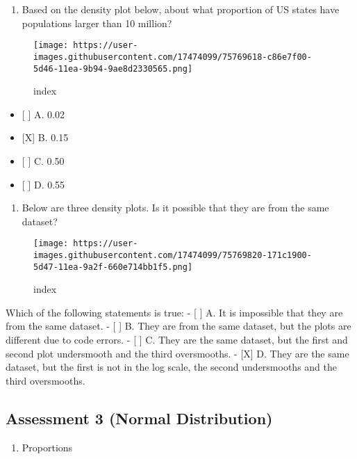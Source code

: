 \documentclass[]{article}
\providecommand{\tightlist}{%
  \setlength{\itemsep}{0pt}\setlength{\parskip}{0pt}}
\begin{document}
\begin{enumerate}
\def\labelenumi{\arabic{enumi}.}
\setcounter{enumi}{8}
\tightlist
\item
  Based on the density plot below, about what proportion of US states
  have populations larger than 10 million?
\end{enumerate}

\begin{figure}
\centering
\texttt{[image: https://user-images.githubusercontent.com/17474099/75769618-c86e7f00-5d46-11ea-9b94-9ae8d2330565.png]}
\caption{index}
\end{figure}

\begin{itemize}
\tightlist
\item
  {[} {]} A. 0.02
\item
  {[}X{]} B. 0.15
\item
  {[} {]} C. 0.50
\item
  {[} {]} D. 0.55
\end{itemize}

\begin{enumerate}
\def\labelenumi{\arabic{enumi}.}
\setcounter{enumi}{9}
\tightlist
\item
  Below are three density plots. Is it possible that they are from the
  same dataset?
\end{enumerate}

\begin{figure}
\centering
\texttt{[image: https://user-images.githubusercontent.com/17474099/75769820-171c1900-5d47-11ea-9a2f-660e714bb1f5.png]}
\caption{index}
\end{figure}

Which of the following statements is true: - {[} {]} A. It is impossible
that they are from the same dataset. - {[} {]} B. They are from the same
dataset, but the plots are different due to code errors. - {[} {]} C.
They are the same dataset, but the first and second plot undersmooth and
the third oversmooths. - {[}X{]} D. They are the same dataset, but the
first is not in the log scale, the second undersmooths and the third
oversmooths.

\hypertarget{assessment-3-normal-distribution}{%
\subsection{Assessment 3 (Normal
Distribution)}\label{assessment-3-normal-distribution}}

\begin{enumerate}
\def\labelenumi{\arabic{enumi}.}
\tightlist
\item
  Proportions
\end{enumerate}
\end{document}
